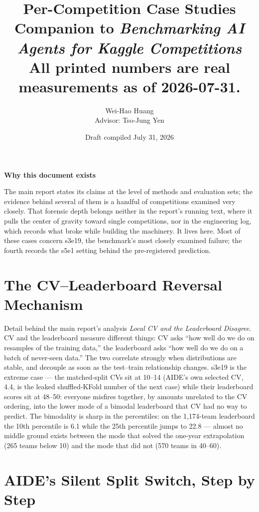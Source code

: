 \documentclass[11pt,a4paper]{article}
\title{\textbf{Per-Competition Case Studies}\\
\large Companion to \emph{Benchmarking AI Agents for Kaggle Competitions}\\
\normalsize\textcolor{orange!85!black}{All printed numbers are real measurements as of 2026-07-31.}}
\author{Wei-Hao Huang\\\small Advisor: Tso-Jung Yen}
\date{Draft compiled July 31, 2026}
\begin{document}
\maketitle

\begin{center}\textbf{\large Why this document exists}\end{center}
\noindent The main report states its claims at the level of methods and evaluation sets; the
evidence behind several of them is a handful of competitions examined very closely. That
forensic depth belongs neither in the report's running text, where it pulls the center of
gravity toward single competitions, nor in the engineering log, which records what broke while
building the machinery. It lives here. Most of these cases concern s3e19, the benchmark's
most closely examined failure; the fourth records the s5e1 setting behind the pre-registered prediction.

\vspace{0.5em}

\section{The CV--Leaderboard Reversal Mechanism}

Detail behind the main report's analysis \emph{Local CV and the Leaderboard Disagree}. CV and
the leaderboard measure different things: CV asks ``how well do we do on resamples of the
training data,'' the leaderboard asks ``how well do we do on a batch of never-seen data.'' The
two correlate strongly when distributions are stable, and decouple as soon as the test--train
relationship changes. s3e19 is the extreme case --- the matched-split CVs sit at 10--14
(AIDE's own selected CV, 4.4, is the leaked shuffled-KFold number of the next case) while
their leaderboard scores sit at 48--50: everyone misfires together, by amounts unrelated to the
CV ordering, into the lower mode of a bimodal leaderboard that CV had no way to predict. The
bimodality is sharp in the percentiles: on the 1{,}174-team leaderboard the 10th percentile is
6.1 while the 25th percentile jumps to 22.8 --- almost no middle ground exists between the mode
that solved the one-year extrapolation (265 teams below 10) and the mode that did not (570
teams in 40--60).

\section{AIDE's Silent Split Switch, Step by Step}
\end{document}

